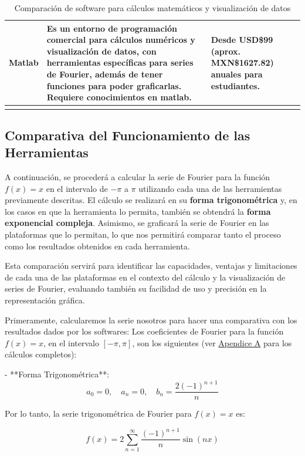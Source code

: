 \begin{longtable}{ | m{2.5cm} | m{6.5cm} | m{4cm} | }
	Matlab  & Es un entorno de programación comercial para cálculos numéricos y visualización de datos, con herramientas específicas para series de Fourier, además de tener funciones para poder graficarlas. Requiere conocimientos en matlab.~\cite{MathWorks2024} & Desde USD\$99 (aprox. MXN\$1627.82) anuales para estudiantes.\\ \hline	
	\rowcolor{white}\caption{Comparación de software para cálculos matemáticos y visualización de datos} \label{tabla:software} \\
\end{longtable}


\subsection{Comparativa del Funcionamiento de las Herramientas}

A continuación, se procederá a calcular la serie de Fourier para la función \( f(x) = x \) en el intervalo de \(-\pi\) a \(\pi\) utilizando cada una de las herramientas previamente descritas. El cálculo se realizará en su \textbf{forma trigonométrica} y, en los casos en que la herramienta lo permita, también se obtendrá la \textbf{forma exponencial compleja}. Asimismo, se graficará la serie de Fourier en las plataformas que lo permitan, lo que nos permitirá comparar tanto el proceso como los resultados obtenidos en cada herramienta. \newline

Esta comparación servirá para identificar las capacidades, ventajas y limitaciones de cada una de las plataformas en el contexto del cálculo y la visualización de series de Fourier, evaluando también su facilidad de uso y precisión en la representación gráfica.\newline

Primeramente, calcularemos la serie nosotros para hacer una comparativa con los resultados dados por los softwares:\newline
Los coeficientes de Fourier para la función \( f(x) = x \), en el intervalo \( [-\pi, \pi] \), son los siguientes (ver \hyperref[app:Estado-del-arte-coeff]{Apendice A} para los cálculos completos):

- **Forma Trigonométrica**:
\[
a_0 = 0, \quad a_n = 0, \quad b_n = \frac{2 (-1)^{n+1}}{n}
\]

Por lo tanto, la serie trigonométrica de Fourier para \( f(x) = x \) es:

\[
f(x) = 2 \sum_{n=1}^{\infty} \frac{(-1)^{n+1}}{n} \sin(n x)
\]

